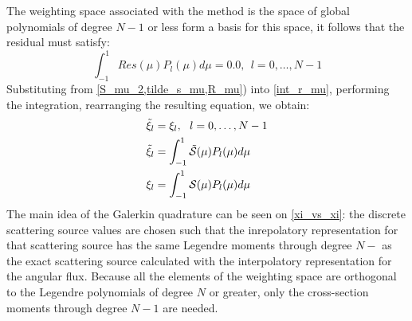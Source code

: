 The weighting space associated with the method is the space of global
polynomials of degree $N-1$ or less form a basis for this space, it follows
that the residual must satisfy:
\begin{equation}
\int_{-1}^1 Res(\mu) P_l(\mu) d\mu = 0.0,\ \ l=0,\hdots,N-1
\label{int_r_mu}
\end{equation}
Substituting from \cref{S_mu_2,tilde_s_mu,R_mu}) into \cref{int_r_mu}, 
performing the integration, rearranging the resulting equation, we obtain:
\begin{align}
&\tilde{\xi}_l = \xi_l,\ \ l=0,\hdots,N-1 \label{xi_vs_xi}\\
&\tilde{\xi}_l = \int_{-1}^1 \tilde{\mc{S}}(\mu) P_l(\mu) d\mu\\
&\xi_l = \int_{-1}^1 \mc{S}(\mu) P_l(\mu) d\mu
\end{align}
The main idea of the Galerkin quadrature can be seen on \cref{xi_vs_xi}: the
discrete scattering source values are chosen such that the inrepolatory
representation for that scattering source has the same Legendre moments
through degree $N-$ as the exact scattering source calculated with the
interpolatory representation for the angular flux. Because all the elements of
the weighting space are orthogonal to the Legendre polynomials of degree $N$
or greater, only the cross-section moments through degree $N-1$ are needed.


